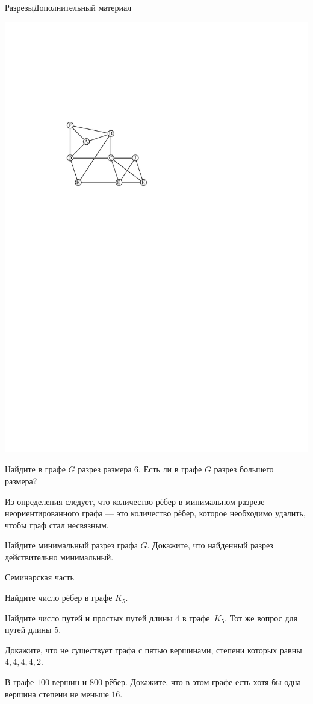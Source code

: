 \begin{frame}{Разрезы}{Дополнительный материал}

\centerline{\includegraphics[scale=0.6]{img/graph1.pdf}}

\exmpl Найдите в графе $G$ разрез размера $6$. Есть ли в графе
$G$ разрез большего размера?
\spc

Из определения следует, что количество рёбер в минимальном разрезе
неориентированного графа --- это количество рёбер, которое необходимо
удалить, чтобы граф стал несвязным.

\exmpl Найдите минимальный разрез графа $G$. Докажите,
что найденный разрез действительно минимальный.

\end{frame}

\begin{frame}{Семинарская часть}

\z Найдите число рёбер в графе $K_5$.

\z Найдите число путей и простых путей длины $4$ в графе~$K_5.$ Тот же вопрос для путей длины $5$.

\z Докажите, что не существует графа с пятью вершинами, степени которых равны $4, 4, 4, 4, 2.$

\z В графе $100$ вершин и $800$ рёбер. Докажите, что в этом графе есть
хотя бы одна вершина степени не меньше $16.$

\end{frame}

